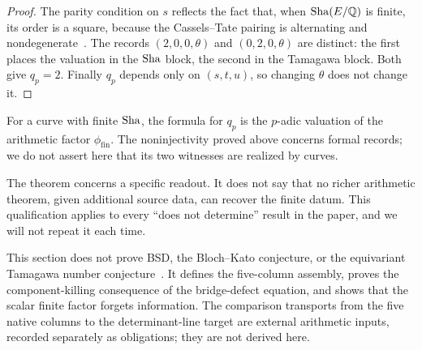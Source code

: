 \begin{proof}
The parity condition on $s$ reflects the fact that, when $\operatorname{Sha}(E/\mathbb{Q})$ is
finite, its order is a square, because the Cassels--Tate pairing is
alternating and nondegenerate~\citep{Cassels1962,PoonenStoll1999}.  The
records $(2,0,0,\theta)$ and $(0,2,0,\theta)$ are distinct: the first
places the valuation in the $\operatorname{Sha}$ block, the second in the Tamagawa
block.  Both give $q_p=2$.  Finally $q_p$ depends only on $(s,t,u)$, so
changing $\theta$ does not change it.
\end{proof}

For a curve with finite $\operatorname{Sha}$, the formula for $q_p$ is the $p$-adic
valuation of the arithmetic factor $\phi_{\mathrm{fin}}$.  The
noninjectivity proved above concerns formal records; we do not assert here
that its two witnesses are realized by curves.

The theorem concerns a specific readout.  It does not say that no richer
arithmetic theorem, given additional source data, can recover the finite
datum.  This qualification applies to every ``does not determine'' result
in the paper, and we will not repeat it each time.

\begin{nonclaim}
\label{nonclaim:apparatus:decomposition-scope}
This section does not prove BSD, the Bloch--Kato conjecture, or the
equivariant Tamagawa number conjecture~\citep{BurnsFlach2001}.  It defines
the five-column assembly, proves the component-killing consequence of the
bridge-defect equation, and shows that the scalar finite factor forgets
information.  The comparison transports from the five native columns to
the determinant-line target are external arithmetic inputs, recorded
separately as obligations; they are not derived here.
\end{nonclaim}
